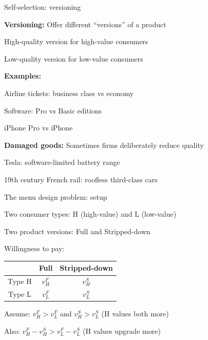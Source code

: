 \documentclass[notes,11pt, aspectratio=169]{beamer}
\newenvironment{wideitemize}{\itemize\addtolength{\itemsep}{10pt}}{\enditemize}
\begin{document}
\begin{frame}{Self-selection: versioning}
	\begin{wideitemize}
		\item \textbf{Versioning:} Offer different ``versions'' of a product
		\begin{wideitemize}
			\vspace{5pt}
			\item High-quality version for high-value consumers
			\item Low-quality version for low-value consumers
		\end{wideitemize}
		\item \textbf{Examples:}
		\begin{wideitemize}
			\vspace{5pt}
			\item Airline tickets: business class vs economy
			\item Software: Pro vs Basic editions
			\item iPhone Pro vs iPhone
		\end{wideitemize}
		\item \textbf{Damaged goods:} Sometimes firms deliberately reduce quality
		\begin{wideitemize}
			\vspace{5pt}
			\item Tesla: software-limited battery range
			\item 19th century French rail: roofless third-class cars
		\end{wideitemize}
	\end{wideitemize}
\end{frame}

\begin{frame}{The menu design problem: setup}
	\begin{wideitemize}
		\item Two consumer types: H (high-value) and L (low-value)
		\item Two product versions: Full and Stripped-down
		\item Willingness to pay:
		\begin{center}
			\begin{tabular}{|c|c|c|}
				\hline
				& Full & Stripped-down \\
				\hline
				Type H & $v_H^F$ & $v_H^S$ \\
				Type L & $v_L^F$ & $v_L^S$ \\
				\hline
			\end{tabular}
		\end{center}
		\item Assume: $v_H^F > v_L^F$ and $v_H^S > v_L^S$ (H values both more)
		\item Also: $v_H^F - v_H^S > v_L^F - v_L^S$ (H values upgrade more)
	\end{wideitemize}
\end{frame}
\end{document}
